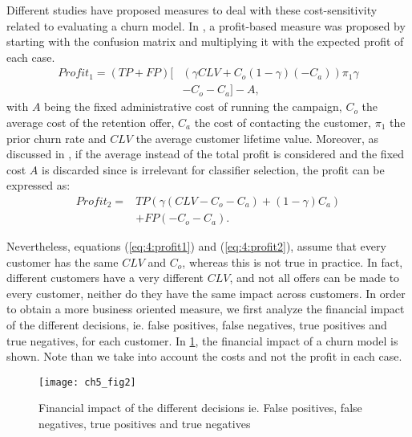 Different studies have proposed measures to deal with these cost-sensitivity related to
evaluating a churn model. In \citep{Neslin2006}, a profit-based measure was proposed by starting 
with the confusion matrix and multiplying it with the expected profit of each case.
\begin{align}\label{eq:4:profit1}
 Profit_1 = (TP+FP)\bigg[ & \left(\gamma CLV + C_o(1-\gamma)(-C_a)\right)\pi_1\gamma \nonumber \\
 & -C_o-C_a\bigg]-A,
\end{align}
with $A$ being the fixed administrative cost of running the campaign, $C_o$ the average cost of the 
retention offer, $C_a$ the cost of contacting the customer, $\pi_1$ the prior churn rate and $CLV$ 
the average customer lifetime value.
Moreover, as discussed in \citep{Verbraken2013}, if the average instead of the total profit is 
considered and the fixed cost $A$ is discarded since is irrelevant for classifier selection, the 
profit can be expressed as:
\begin{align}\label{eq:4:profit2}
 Profit_2 = &TP\left(\gamma(CLV-C_o-C_a)+(1-\gamma)C_a \right) \nonumber \\
 &+FP(-C_o-C_a).
\end{align}

Nevertheless, equations (\ref{eq:4:profit1}) and (\ref{eq:4:profit2}), assume that every customer 
has the same $CLV$ and $C_o$, whereas this is not true in practice. In fact, different customers 
have a very different $CLV$, and not all offers can be made to every customer, neither do they have 
the same impact across customers. In order to obtain a more business oriented measure, we first 
analyze the financial impact of the different decisions, ie. false positives, false negatives, true 
positives and true negatives, for each customer.	In \figurename{ \ref{fig:ch5:2}}, the financial 
impact of a churn model is shown. Note than we take into account the costs and not the profit in 
each case.

\begin{figure}[t]
  \centering
  \texttt{[image: ch5\_fig2]}
  \caption{Financial impact of the different decisions ie. False positives, false negatives, 
  true 	positives and true negatives}
	\label{fig:ch5:2}
\end{figure}

